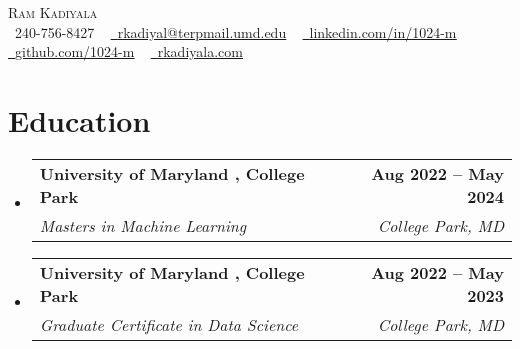 \documentclass[letterpaper,11pt]{article}
\makeatletter
\newcommand{\resumeSubheading}[4]{
  \vspace{-2pt}\item
    \begin{tabular*}{1.0\textwidth}[t]{l@{\extracolsep{\fill}}r}
      \textbf{#1} & \textbf{\small #2} \\
      \textit{\small#3} & \textit{\small #4} \\
    \end{tabular*}\vspace{-7pt}
}
\newcommand{\resumeSubHeadingListStart}{\begin{itemize}[leftmargin=0.0in, label={}]}
\newcommand{\resumeSubHeadingListEnd}{\end{itemize}}
\makeatother
\begin{document}
\begin{center}
    {\Huge \scshape \textcolor{myColor1}{Ram Kadiyala}} \\ \vspace{1pt}
    \small \raisebox{-0.1\height}\faPhone\ \textcolor{myColor2}{240-756-8427} ~ \href{mailto:rkadiyal@terpmail.umd.edu}{\raisebox{-0.2\height}\faEnvelope\  \underline{\textcolor{myColor2}{rkadiyal@terpmail.umd.edu}}} ~ 
    \href{https://linkedin.com/in/1024-m/}{\raisebox{-0.2\height}\faLinkedin\ \underline{\textcolor{myColor2}{linkedin.com/in/1024-m}}}  ~
    \href{https://github.com/1024-m}{\raisebox{-0.2\height}\faGithub\ \underline{\textcolor{myColor2}{github.com/1024-m}}} ~
    \href{https://www.rkadiyala.com}{\raisebox{-0.2\height}\faGlobe\ \underline{\textcolor{myColor2}{rkadiyala.com}}}
    \vspace{-10pt}
\end{center}
\section{\textcolor{myColor1}{Education}}
  \resumeSubHeadingListStart
    \resumeSubheading
      {\textcolor{myColor2}{University of Maryland , College Park}}{\textcolor{myColor2}{Aug 2022 -- May 2024}}
      {Masters in Machine Learning}{College Park, MD}\vspace{-4pt}
    \resumeSubheading
      {\textcolor{myColor2}{University of Maryland , College Park}}{\textcolor{myColor2}{Aug 2022 -- May 2023}}
      {Graduate Certificate in Data Science}{College Park, MD}\vspace{-4pt}
  \resumeSubHeadingListEnd
  \vspace{-16pt}
\end{document}
